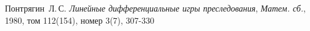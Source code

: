 \begin{thebibliography}{0}
	 Понтрягин~Л.\,С.
	\emph{Линейные дифференциальные игры преследования}, \emph{Матем. сб.}, 1980, том 112(154), номер 3(7), 307-330
\end{thebibliography}